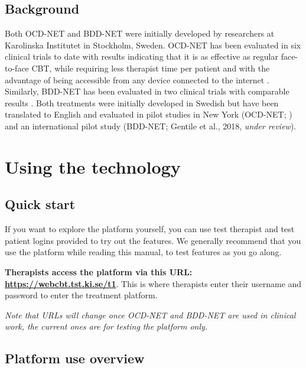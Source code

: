 \documentclass[]{book}
\theoremstyle{definition}
\theoremstyle{definition}
\theoremstyle{definition}
\theoremstyle{remark}
\begin{document}
\hypertarget{background}{%
\section{Background}\label{background}}

Both OCD-NET and BDD-NET were initially developed by researchers at
Karolinska Institutet in Stockholm, Sweden. OCD-NET has been evaluated
in six clinical trials to date with results indicating that it is as
effective as regular face-to-face CBT, while requiring less therapist
time per patient and with the advantage of being accessible from any
device connected to the internet
\citep{andersson2011a, andersson2012, andersson2014a, andersson2015a, ruck2018}.
Similarly, BDD-NET has been evaluated in two clinical trials with
comparable results \citep{enander2014, enander2016}. Both treatments
were initially developed in Swedish but have been translated to English
and evaluated in pilot studies in New York (OCD-NET; \citet{patel2017})
and an international pilot study (BDD-NET; Gentile et al., 2018,
\emph{under review}).

\hypertarget{using-the-technology}{%
\chapter{Using the technology}\label{using-the-technology}}

\hypertarget{quick-start}{%
\section{Quick start}\label{quick-start}}

If you want to explore the platform yourself, you can use test therapist
and test patient logins provided to try out the features. We generally
recommend that you use the platform while reading this manual, to test
features as you go along.

\textbf{Therapists access the platform via this URL:
\url{https://webcbt.tst.ki.se/t1}}. This is where therapists enter their
username and password to enter the treatment platform.

\emph{Note that URLs will change once OCD-NET and BDD-NET are used in
clinical work, the current ones are for testing the platform only.}

\hypertarget{platform-use-overview}{%
\section{Platform use overview}\label{platform-use-overview}}
\end{document}

